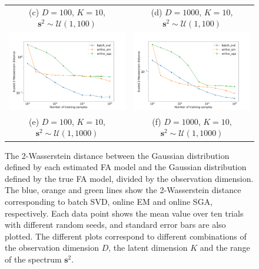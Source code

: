 \documentclass[msc,deptreport.inf]{infthesis} %
\newcommand{\matr}[1]{\mathbf{#1}}
\begin{document}
\begin{figure}[!htbp]
\begin{tabular}{cc}
		 (c) $D=100$, $K=10$, $\matr{s}^2 \sim \mathcal{U}(1, 100)$ 
		 & (d) $D=1000$, $K=10$, $\matr{s}^2 \sim \mathcal{U}(1, 100)$\\[6pt]
		 \includegraphics[width=70mm]{plots/online_fa_wasserstein__observation_dim=100__latent_dim=10__spectrum_min=1__spectrum_max=1000.png} 
		 & \includegraphics[width=70mm]{plots/online_fa_wasserstein__observation_dim=1000__latent_dim=10__spectrum_min=1__spectrum_max=1000.png} \\
		 (e) $D=100$, $K=10$, $\matr{s}^2 \sim \mathcal{U}(1, 1000)$ 
		 & (f) $D=1000$, $K=10$, $\matr{s}^2 \sim \mathcal{U}(1, 1000)$\\[6pt]
	\end{tabular}
	\caption{The 2-Wasserstein distance between the Gaussian distribution defined by each estimated FA model and the Gaussian distribution defined by the true FA model, divided by the observation dimension. The blue, orange and green lines show the 2-Wasserstein distance corresponding to batch SVD, online EM and online SGA, respectively. Each data point shows the mean value over ten trials with different random seeds, and standard error bars are also plotted. The different plots correspond to different combinations of the observation dimension $D$, the latent dimension $K$ and the range of the spectrum $\matr{s}^2$.}
	\label{fig:fa_wasserstein}
\end{figure}
 
\end{document}
